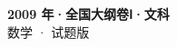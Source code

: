 \documentclass[zihao=-4, a4paper]{ctexart}
\begin{document}
\begin{center}
  {\Large\bfseries 2009 年·全国大纲卷Ⅰ·文科}\\[4pt]
  {\large 数学 · 试题版}
\end{center}
\medskip
{}

\end{document}
